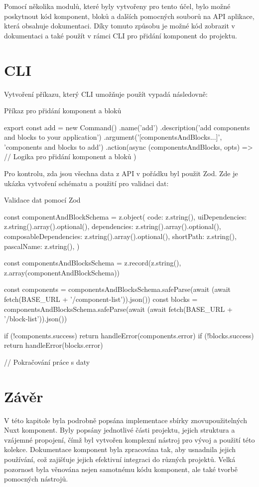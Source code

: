 Pomocí několika modulů, které byly vytvořeny pro tento účel, bylo možné poskytnout kód komponent, bloků a dalších pomocných souborů na API aplikace, která obsahuje dokumentaci. Díky tomuto způsobu je možné kód zobrazit v dokumentaci a také použít v rámci CLI pro přidání komponent do projektu.

\section{CLI}
Vytvoření příkazu, který CLI umožňuje použít vypadá následovně:

\begin{listing}[H]
    \caption{Příkaz pro přidání komponent a bloků}
    \label{lst:cli-install}
    \begin{code}
export const add = new Command()
.name('add')
.description('add components and blocks to your application')
.argument('[componentsAndBlocks...]', 'components and blocks to add')
.action(async (componentsAndBlocks, opts) => {
    // Logika pro přidání komponent a bloků
})        
    \end{code}
\end{listing}

\clearpage

Pro kontrolu, zda jsou všechna data z API v pořádku byl použit Zod. Zde je ukázka vytvoření schématu a použití pro validaci dat:

\begin{listing}[H]
    \caption{Validace dat pomocí Zod}
    \label{lst:cli-install}
    \begin{code}
const componentAndBlockSchema = z.object({
  code: z.string(),
  uiDependencies: z.string().array().optional(),
  dependencies: z.string().array().optional(),
  composableDependencies: z.string().array().optional(),
  shortPath: z.string(),
  pascalName: z.string(),
})

const componentsAndBlocksSchema = z.record(z.string(), z.array(componentAndBlockSchema))

const components = componentsAndBlocksSchema.safeParse(await (await fetch(BASE_URL + '/component-list')).json())
const blocks = componentsAndBlocksSchema.safeParse(await (await fetch(BASE_URL + '/block-list')).json())

if (!components.success) {
    return handleError(components.error)
}
if (!blocks.success) {
    return handleError(blocks.error)
}

// Pokračování práce s daty
    \end{code}
\end{listing}

\section{Závěr}
V této kapitole byla podrobně popsána implementace sbírky znovupoužitelných Nuxt komponent. Byly popsány jednotlivé části projektu, jejich struktura a vzájemné propojení, čímž byl vytvořen komplexní nástroj pro vývoj a použití této kolekce. Dokumentace komponent byla zpracována tak, aby usnadnila jejich používání, což zajišťuje jejich efektivní integraci do různých projektů. Velká pozornost byla věnována nejen samotnému kódu komponent, ale také tvorbě pomocných nástrojů.